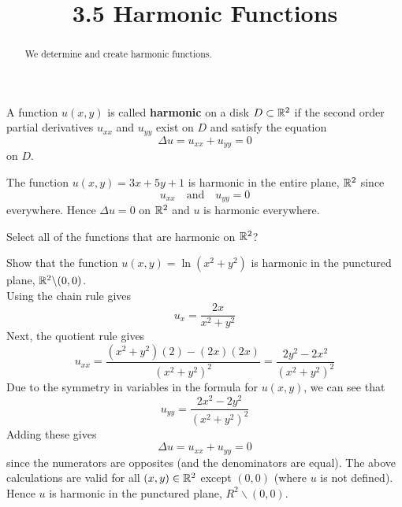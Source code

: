 \documentclass[handout]{ximera}
\title{3.5 Harmonic Functions}
\begin{document}
\begin{abstract}
We determine and create harmonic functions.
\end{abstract}

\maketitle


\begin{definition}
A function $u(x,y)$ is called {\bf harmonic} on a disk $D \subset \mathbb R^2$ if the second order partial derivatives
$u_{xx}$ and $u_{yy}$ exist on $D$ and satisfy the equation
\[
\Delta u = u_{xx} + u_{yy} = 0
\]
on $D$.
\end{definition}

\begin{example}
The function $u(x,y) = 3x + 5y +1$ is harmonic in the entire plane, $\mathbb R^2$ since
\[
u_{xx} \quad \text{and} \quad u_{yy} = 0
\]
everywhere. Hence $\Delta u = 0$ on $\mathbb R^2$ and $u$ is harmonic everywhere.
\end{example}

\begin{problem}
Select all of the functions that are harmonic on $\mathbb R^2$?\\
\begin{selectAll}
\end{selectAll}
\end{problem}


\begin{example}
Show that the function $u(x,y) = \ln\left(x^2 + y^2\right)$ is harmonic in the 
punctured plane, $\mathbb R^2 \backslash (0,0)$.\\
Using the chain rule gives
\[
u_x = \frac{2x}{x^2 + y^2}
\]
Next, the quotient rule gives
\[
u_{xx} = \frac{(x^2+y^2)(2)- (2x)(2x)}{\left(x^2 +y^2\right)^2} = \frac{2y^2-2x^2}{\left(x^2 +y^2\right)^2}
\]
Due to the symmetry in variables in the formula for $u(x,y)$, we can see that
\[
u_{yy} = \frac{2x^2-2y^2}{\left(x^2 +y^2\right)^2}
\]
Adding these gives
\[
\Delta u = u_{xx} + u_{yy} = 0
\]
since the numerators are opposites (and the denominators are equal). 
The above calculations are valid for all $(x,y)\in \mathbb R^2$ except $(0,0)$ (where $u$ is not defined).  
Hence $u$ is harmonic in the punctured plane, $R^2\backslash (0,0)$.
\end{example}
\end{document}
